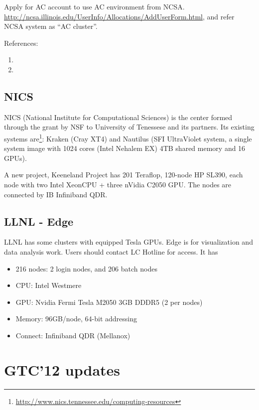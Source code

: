 Apply for AC account to use AC environment from NCSA. 
\url{http://ncsa.illinois.edu/UserInfo/Allocations/AddUserForm.html},
and refer NCSA system as ``AC cluster''. 


References:
\begin{enumerate}
  \item
  \item
\end{enumerate}

\subsection{NICS}
\label{sec:GeorgeTech-NSF}

NICS (National Institute for Computational Sciences) is the center formed
through the grant by NSF to University of Tenessese and its partners. Its
existing systems
are\footnote{\url{http://www.nics.tennessee.edu/computing-resources}}:
Kraken (Cray XT4) and Nautilus (SFI UltraViolet system, a single system image
with 1024 cores (Intel Nehalem EX) 4TB shared memory and 16 GPUs).

A new project, Keeneland Project has 201 Teraflop, 120-node HP SL390, each node
with two Intel XeonCPU + three nVidia C2050 GPU. The nodes are connected by IB Infiniband QDR.



\subsection{LLNL - Edge}
\label{sec:Edge}

LLNL has some clusters with equipped Tesla GPUs. Edge is for visualization and
data analysis work. Users should contact LC Hotline for access. It has
\begin{itemize}
  \item 216 nodes: 2 login nodes, and 206 batch nodes
  \item CPU: Intel Westmere
  \item GPU: Nvidia Fermi Tesla M2050 3GB DDDR5 (2 per nodes)
  \item Memory: 96GB/node, 64-bit addressing
  \item Connect: Infiniband QDR (Mellanox)
\end{itemize}

\section{GTC'12 updates}

